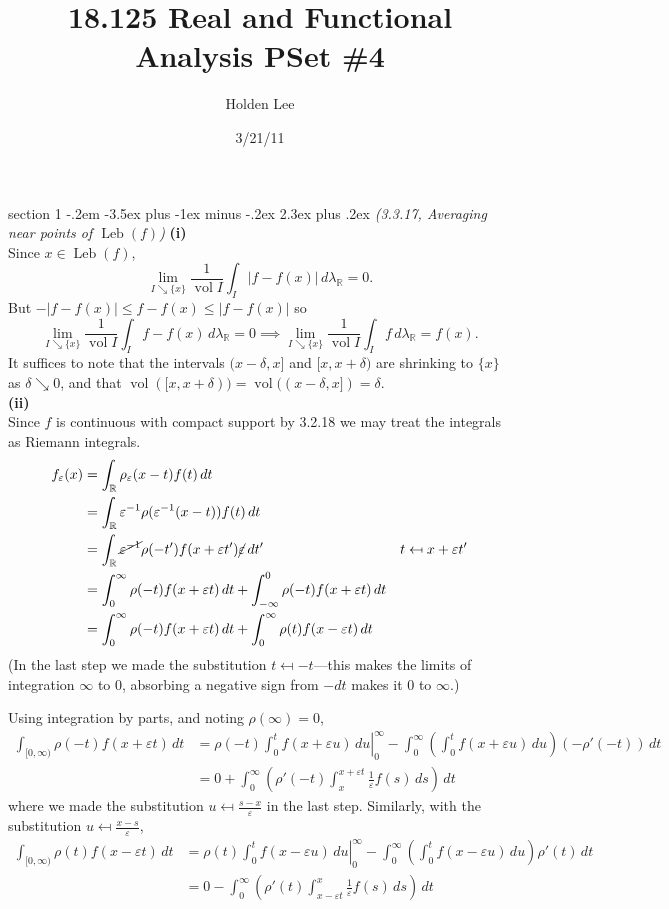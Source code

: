 \documentclass[12pt]{article}
\makeatletter
\theoremstyle{norm}
\newcommand{\R}[0]{\mathbb{R}}
\newcommand{\rc}[1]{\frac{1}{#1}}
\newcommand{\de}[0]{\delta}
\newcommand{\ep}[0]{\varepsilon}
\newcommand{\la}[0]{\lambda}
\newcommand{\rh}[0]{\rho}
\newcommand{\pa}[1]{\left( {#1} \right)}
\newcommand{\subprob}[1]{\noindent\textbf{#1}\\}
\newcommand{\Leb}[0]{\operatorname{Leb}}
\newcommand{\vol}[0]{\operatorname{vol}}
\newcommand{\iy}[0]{\infty}
\newenvironment{problem}{\@startsection
       {section}
       {1}
       {-.2em}
       {-3.5ex plus -1ex minus -.2ex}
       {2.3ex plus .2ex}
       {\pagebreak[3]%
       \large\bf\noindent{Problem }
       }
       }
       {%
       }
\makeatother
\begin{document}
\title{18.125 Real and Functional Analysis PSet \#4}%
\author{Holden Lee}
\date{3/21/11}%
\maketitle
\thispagestyle{empty}
\begin{problem}{\it (3.3.17, Averaging near points of $\Leb(f)$)}
\subprob{(i)}
Since $x\in \Leb(f)$,
\[
\lim_{I\searrow \{x\}} \rc{\vol{I}}\int_I|f-f(x)|\,d\la_{\R}=0.
\]
But $-|f-f(x)|\le f-f(x)\le |f-f(x)|$ so
\[
\lim_{I\searrow \{x\}} \rc{\vol{I}}\int_I f-f(x)\,d\la_{\R}=0\implies \lim_{I\searrow \{x\}} \rc{\vol{I}}\int_I f\,d\la_{\R}=f(x).
\]
It suffices to note that the intervals $(x-\de,x]$ and $[x,x+\de)$ are shrinking to $\{x\}$ as $\de\searrow 0$, and that $\vol([x,x+\de))=\vol((x-\de,x])=\de$.\\

\subprob{(ii)}
Since $f$ is continuous with compact support by 3.2.18 we may treat the integrals as Riemann integrals. %
\begin{align*}
f_{\ep}(x)&=\int_{\R} \rh_{\ep}(x-t) f(t)\,dt\\
&=\int_{\R}\ep^{-1}\rh(\ep^{-1}(x-t))f(t)\,dt\\
&=\int_{\R}\cancel{\ep^{-1}}\rho(-t')f(x+\ep t')\cancel{\ep} \,dt'&t\mapsfrom x+\ep t'\\
&=\int_{0}^{\iy}\rho(-t)f(x+\ep t)\,dt+
\int_{-\iy}^{0}\rho(-t)f(x+\ep t)\,dt\\
&=\int_{0}^{\iy}\rho(-t)f(x+\ep t)\,dt+
\int_{0}^{\iy}\rho(t)f(x-\ep t)\,dt
\end{align*}
(In the last step we made the substitution $t\mapsfrom -t$---this makes the limits of integration $\iy$ to 0, absorbing a negative sign from $-dt$ makes it $0$ to $\iy$.)

Using integration by parts, and noting $\rh(\iy)=0$,
\begin{align*}
\int_{[0,\iy)} \rh(-t)f(x+\ep t)\,dt
&=\left.\rh(-t)\int_0^t f(x+\ep u)\,du\right|^{\iy}_0-\int_0^{\iy} \pa{\int_0^t f(x+\ep u)\,du}(-\rh'(-t))\,dt\\
&=0+\int_0^{\iy}\pa{\rh'(-t)\int_x^{x+\ep t} \rc{\ep}f(s)\,ds}\,dt
\end{align*}
where we made the substitution $u\mapsfrom \frac{s-x}{\ep}$ in the last step. Similarly, with the substitution $u\mapsfrom \frac{x-s}{\ep}$,
\begin{align*}
\int_{[0,\iy)} \rh(t)f(x-\ep t)\,dt
&=\left.\rh(t)\int_0^t f(x-\ep u)\,du\right|^{\iy}_0-\int_0^{\iy} \pa{\int_0^t f(x-\ep u)\,du}\rh'(t)\,dt\\
&=0-\int_0^{\iy}\pa{\rh'(t)\int_{x-\ep t}^x \rc{\ep}f(s)\,ds}\,dt
\end{align*}


\end{problem}
\end{document}
